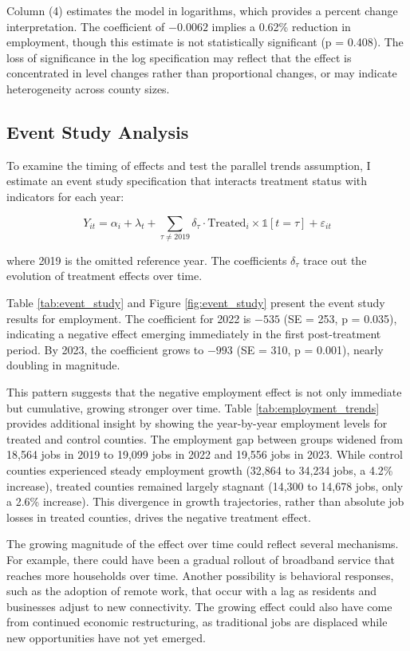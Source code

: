 \documentclass[12pt]{article}
\begin{document}
Column (4) estimates the model in logarithms, which provides a percent change interpretation. The coefficient of $-0.0062$ implies a 0.62\% reduction in employment, though this estimate is not statistically significant (p = 0.408). The loss of significance in the log specification may reflect that the effect is concentrated in level changes rather than proportional changes, or may indicate heterogeneity across county sizes.

\subsection{Event Study Analysis}

To examine the timing of effects and test the parallel trends assumption, I estimate an event study specification that interacts treatment status with indicators for each year:

\begin{equation}
Y_{it} = \alpha_i + \lambda_t + \sum_{\tau \neq 2019} \delta_\tau \cdot \text{Treated}_i \times \mathbb{1}[t=\tau] + \varepsilon_{it}
\end{equation}

where 2019 is the omitted reference year. The coefficients $\delta_\tau$ trace out the evolution of treatment effects over time.

Table \ref{tab:event_study} and Figure \ref{fig:event_study} present the event study results for employment. The coefficient for 2022 is $-535$ (SE = 253, p = 0.035), indicating a negative effect emerging immediately in the first post-treatment period. By 2023, the coefficient grows to $-993$ (SE = 310, p = 0.001), nearly doubling in magnitude.

This pattern suggests that the negative employment effect is not only immediate but cumulative, growing stronger over time. Table \ref{tab:employment_trends} provides additional insight by showing the year-by-year employment levels for treated and control counties. The employment gap between groups widened from 18,564 jobs in 2019 to 19,099 jobs in 2022 and 19,556 jobs in 2023. While control counties experienced steady employment growth (32,864 to 34,234 jobs, a 4.2\% increase), treated counties remained largely stagnant (14,300 to 14,678 jobs, only a 2.6\% increase). This divergence in growth trajectories, rather than absolute job losses in treated counties, drives the negative treatment effect.

The growing magnitude of the effect over time could reflect several mechanisms. For example, there could have been a gradual rollout of broadband service that reaches more households over time. Another possibility is behavioral responses, such as the adoption of remote work, that occur with a lag as residents and businesses adjust to new connectivity. The growing effect could also have come from continued economic restructuring, as traditional jobs are displaced while new opportunities have not yet emerged.
\end{document}

